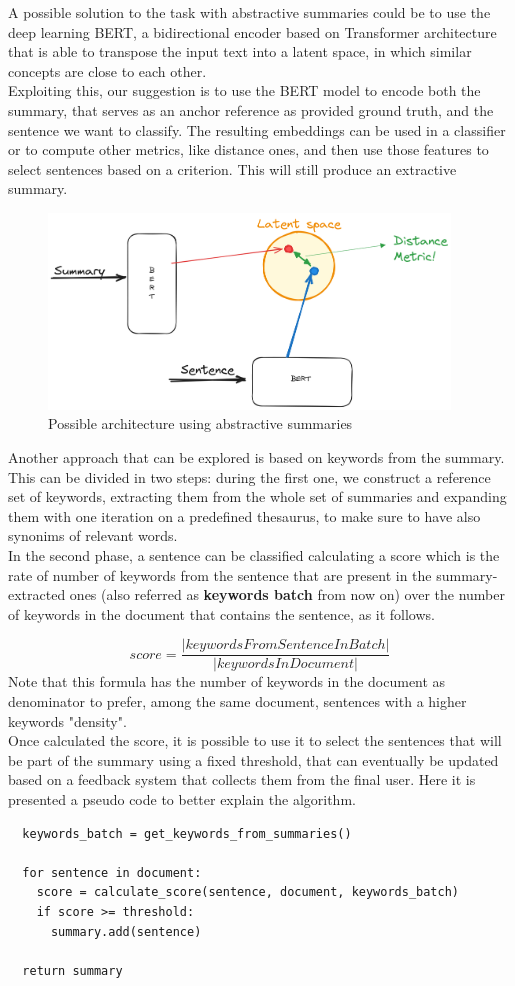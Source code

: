 A possible solution to the task with abstractive summaries could be to use the deep learning BERT, a bidirectional encoder based on Transformer architecture that is able to transpose the input text into a latent space, in which similar concepts are close to each other. \\
Exploiting this, our suggestion is to use the BERT model to encode both the summary, that serves as an anchor reference as provided ground truth, and the sentence we want to classify. The resulting embeddings can be used in a classifier or to compute other metrics, like distance ones, and then use those features to select sentences based on a criterion. This will still produce an extractive summary.
\begin{figure}[H]
  \centering
  \includegraphics[width=0.95\textwidth]{images/abstractive.png}
  \caption{Possible architecture using abstractive summaries}
  \label{fig:abstractive}
\end{figure} 

Another approach that can be explored is based on keywords from the summary. This can be divided in two steps: during the first one, we construct a reference set of keywords, extracting them from the whole set of summaries and expanding them with one iteration on a predefined thesaurus, to make sure to have also synonims of relevant words. \\
In the second phase, a sentence can be classified calculating a score which is the rate of number of keywords from the sentence that are present in the summary-extracted ones (also referred as \textbf{keywords batch} from now on) over the number of keywords in the document that contains the sentence, as it follows.

$$score = \frac{|keywordsFromSentenceInBatch|}{|keywordsInDocument|}$$
Note that this formula has the number of keywords in the document as denominator to prefer, among the same document, sentences with a higher keywords "density".\\
Once calculated the score, it is possible to use it to select the sentences that will be part of the summary using a fixed threshold, that can eventually be updated based on a feedback system that collects them from the final user. 
Here it is presented a pseudo code to better explain the algorithm.

\begin{lstlisting}
  keywords_batch = get_keywords_from_summaries()

  for sentence in document:
    score = calculate_score(sentence, document, keywords_batch)
    if score >= threshold:
      summary.add(sentence)
  
  return summary
  
\end{lstlisting}